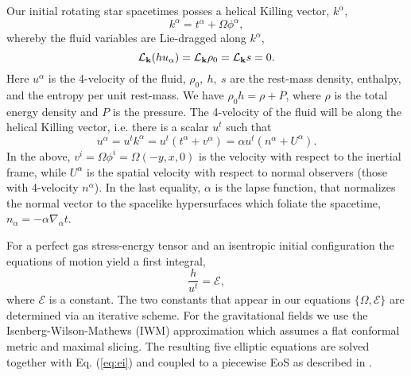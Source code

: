 \documentclass[twocolumn,superscriptaddress,showpacs,prd,aps,amsmath,amssymb,nofootinbib]{revtex4-1}
\newcommand{\GA}{\alpha}
\newcommand{\GR}{\rho}
\newcommand{\GP}{\phi}
\newcommand{\be}{\begin{equation}}
\newcommand{\ee}{\end{equation}}
\begin{document}



Our initial rotating star spacetimes posses a helical Killing vector,
$k^\GA$, \be k^\GA = t^\GA + \Omega \GP^\GA,
\label{eq:hkv}
\ee
whereby the fluid variables are Lie-dragged along $k^\GA$,
\be
\mathcal{L}_{\bf k}(hu_\GA) = \mathcal{L}_{\bf k}\GR_0 = \mathcal{L}_{\bf k} s = 0.
\label{eq:sym}
\ee
Here $u^\GA$ is the 4-velocity of the fluid, $\GR_0,\ h,\ s$ are the rest-mass density, enthalpy, and the 
entropy per unit rest-mass. We have $\GR_0 h=\GR+P$, where $\GR$ is the total energy density
and $P$ is the pressure. The 4-velocity
of the fluid will be along the helical Killing vector, i.e. there is a scalar $u^t$ such that 
\be
u^\GA = u^t k^\GA = u^t (t^\GA + v^\GA) = \GA u^t (n^\GA + U^\GA).
\label{eq:4vel}
\ee In the above, $v^i=\Omega\GP^i=\Omega (-y,x,0)$ is the velocity
with respect to the inertial frame, while $U^\GA$ is the spatial
velocity with respect to normal observers (those with 4-velocity
$n^\GA$). In the last equality, $\GA$ is the lapse function, that
normalizes the normal vector to the spacelike hypersurfaces which
foliate the spacetime, $n_\GA=-\GA\nabla_\GA t$.

For a perfect gas stress-energy tensor and an isentropic initial configuration the equations of motion yield a
first integral,
\be
\frac{h}{u^t} = \mathcal{E},
\label{eq:ei}
\ee where $\mathcal{E}$ is a constant. The two constants that appear
in our equations $\{\Omega,\mathcal{E}\}$ are determined via an
iterative scheme. For the
gravitational fields we use the Isenberg-Wilson-Mathews (IWM)
approximation \cite{I1980, WM1989} which assumes a flat conformal
metric and maximal slicing. The resulting five elliptic equations are
solved together with Eq. (\ref{eq:ei}) and coupled to a piecewise EoS
as described in \cite{HMSU2008,UTGHSTY2016}.
\end{document}
